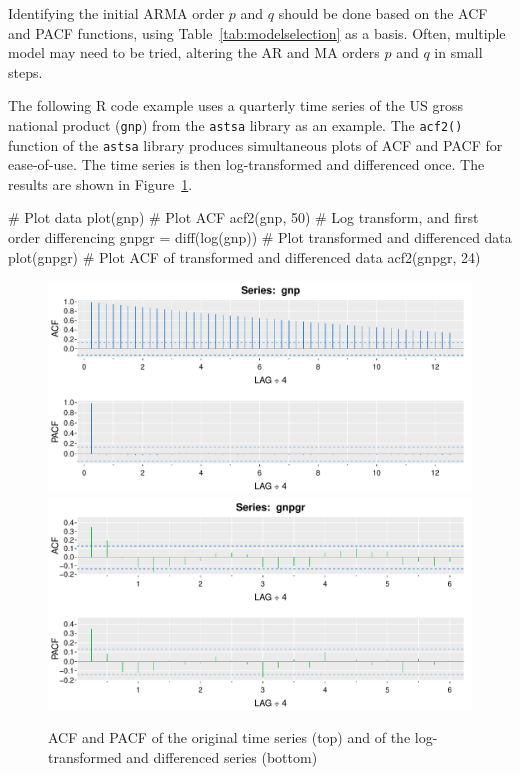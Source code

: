 Identifying the initial ARMA order $p$ and $q$ should be done based on the ACF and PACF functions, using Table~\ref{tab:modelselection} as a basis. Often, multiple model may need to be tried, altering the AR and MA orders $p$ and $q$ in small steps. 

The following R code example uses a quarterly time series of the US gross national product (\texttt{gnp}) from the \texttt{astsa} library as an example. The \texttt{acf2()} function of the \texttt{astsa} library produces simultaneous plots of ACF and PACF for ease-of-use. The time series is then log-transformed and differenced once. The results are shown in Figure~\ref{fig:figure22}.

\begin{samepage}
\begin{Rcode}
# Plot data
plot(gnp)
# Plot ACF
acf2(gnp, 50)
# Log transform, and first order differencing
gnpgr = diff(log(gnp))
# Plot transformed and differenced data
plot(gnpgr)
# Plot ACF of transformed and differenced data
acf2(gnpgr, 24)
\end{Rcode}
\end{samepage}

\begin{figure}
\centering
\includegraphics[width=.75\textwidth]{figure22.pdf} \\
\includegraphics[width=.75\textwidth]{figure23.pdf}
\caption[ACF and PACF after transformations]{ACF and PACF of the original time series (top) and of the log-transformed and differenced series (bottom)}
\label{fig:figure22}
\end{figure}

